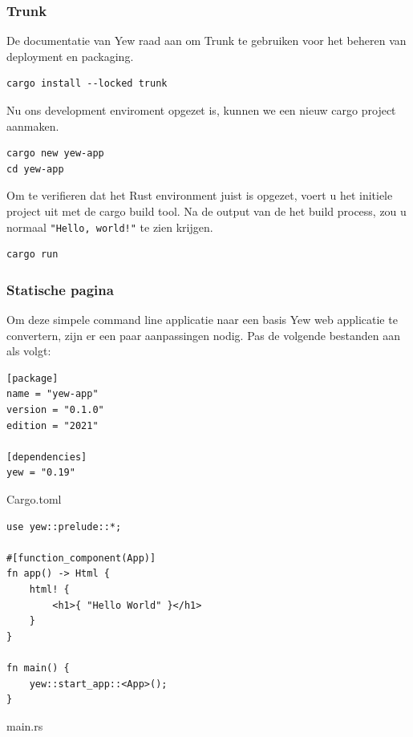 \clearpage

\subsubsection{Trunk}

De documentatie van Yew raad aan om Trunk te gebruiken voor het beheren van deployment en packaging.

\begin{verbatim}
cargo install --locked trunk
\end{verbatim}

Nu ons development enviroment opgezet is, kunnen we een nieuw cargo project aanmaken.

\begin{verbatim}
cargo new yew-app
cd yew-app
\end{verbatim}

Om te verifieren dat het Rust environment juist is opgezet, voert u het initiele project uit met de
cargo build tool. Na de output van de het build process, zou u normaal \texttt{"Hello,
world!"} te zien
krijgen.

\begin{verbatim}
cargo run
\end{verbatim}

\subsubsection{Statische pagina}

Om deze simpele command line applicatie naar een basis Yew web applicatie te convertern, zijn er een
paar aanpassingen nodig. Pas de volgende bestanden aan als volgt:

\begin{listing}[h]
\begin{verbatim}
[package]
name = "yew-app"
version = "0.1.0"
edition = "2021"

[dependencies]
yew = "0.19"
\end{verbatim}
\caption{Cargo.toml}
\end{listing}

\clearpage

\begin{listing}[h]
\begin{verbatim}
use yew::prelude::*;

#[function_component(App)]
fn app() -> Html {
    html! {
        <h1>{ "Hello World" }</h1>
    }
}

fn main() {
    yew::start_app::<App>();
}
\end{verbatim}
\caption{main.rs}
\end{listing}

